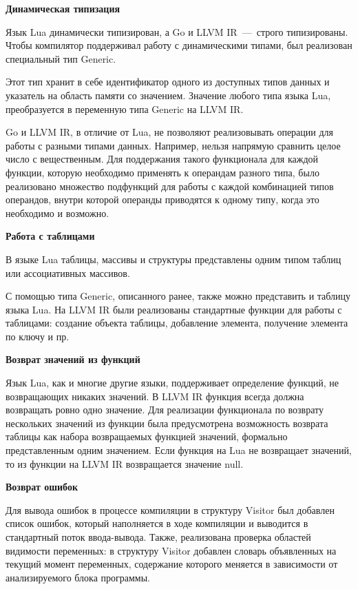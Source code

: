 \textbf{Динамическая типизация}

Язык Lua динамически типизирован, а Go и LLVM IR~---~строго типизированы. Чтобы компилятор поддерживал работу с динамическими типами, был реализован специальный тип Generic.


Этот тип хранит в себе идентификатор одного из доступных типов данных и указатель на область памяти со значением.
Значение любого типа языка Lua, преобразуется в переменную типа Generic на LLVM IR.

Go и LLVM IR, в отличие от Lua, не позволяют реализовывать операции для работы с разными типами данных. Например, нельзя напрямую сравнить целое число с вещественным.
Для поддержания такого функционала для каждой функции, которую необходимо применять к операндам разного типа, было реализовано множество
подфункций для работы с каждой комбинацией типов операндов, внутри которой операнды приводятся к одному типу, когда это необходимо и возможно.

\textbf{Работа с таблицами}

В языке Lua таблицы, массивы и структуры представлены одним типом таблиц или ассоциативных массивов. 


С помощью типа Generic, описанного ранее, также можно представить и таблицу языка Lua. 
На LLVM IR были реализованы стандартные функции для работы с таблицами: создание объекта таблицы, добавление элемента, получение элемента по ключу и пр.

\textbf{Возврат значений из функций}

Язык Lua, как и многие другие языки, поддерживает определение функций, не возвращающих никаких значений.
В LLVM IR функция всегда должна возвращать ровно одно значение. Для реализации функционала по возврату нескольких значений из функции
была предусмотрена возможность возврата таблицы как набора возвращаемых функцией значений, формально представленным одним значением.
Если функция на Lua не возвращает значений, то из функции на LLVM IR возвращается значение null.


\textbf{Возврат ошибок}

Для вывода ошибок в процессе компиляции в структуру Visitor был добавлен список ошибок, который наполняется в ходе компиляции и выводится в стандартный поток ввода-вывода.
Также, реализована проверка областей видимости переменных: в структуру Visitor добавлен словарь объявленных на текущий момент переменных, содержание которого меняется в зависимости от анализируемого блока программы.

